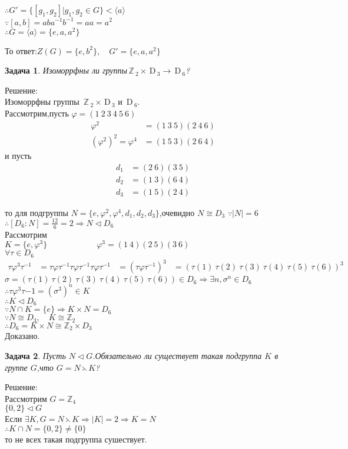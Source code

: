 \documentclass[12pt]{article} %
\theoremstyle{neosn} %
\newtheorem{problem}{Задача} %
\newcommand{\D}{\,\mathrm{D}\,}
\newcommand{\Z}{\,\mathbb{Z}\,}
\begin{document}
$\therefore G'=\{[g_1,g_2]|g_1,g_2\in G\} < \langle a \rangle$\\
$\because [a,b] = aba^{-1}b^{-1}=aa=a^2$\\
$\therefore G=\langle a \rangle = \{e,a,a^2\}$

То ответ:$Z(G)=\{e,b^2\},\quad G'= \{e,a,a^2\}$

\newpage
\begin{problem}
Изоморрфны ли группы$\Z_2\times \D_3\rightarrow\D_6$?
\end{problem}	

Решение:\\
Изоморрфны группы $\Z_2\times \D_3$ и $\D_6$.\\
Рассмотрим,пусть $\varphi = (1\  2\  3\  4\  5\  6)$
\begin{align*}
	\varphi^2&=(1\  3\  5)(2\  4\  6)\\
	(\varphi^2)^2=\varphi^4&=(1\  5\  3)(2\  6\  4)
\end{align*}
и пусть
\begin{align*}
	d_1 &= (2\  6)(3\  5)\\
	d_2 &= (1\  3)(6\  4)\\
	d_3 &= (1\  5)(2\  4)
\end{align*}

то для подгруппы $N = \{e,\varphi^2,\varphi^4,d_1,d_2,d_3\}$,очевидно $N \cong D_3$
$\because|N|=6$\\
$\therefore [D_6\colon N]=\frac{12}{6}=2 \Rightarrow N \lhd D_6$
\\
Рассмотрим\\
$K = \{e,\varphi^3\} \qquad \qquad \qquad \varphi^3=(1 \ 4)(2\ 5)(3 \ 6)$\\
$\forall \tau \in D_6$
\begin{align*}
	\tau \varphi^3 \tau^{-1} &= \tau \varphi \tau^{-1} \tau \varphi \tau^{-1} \tau \varphi \tau^{-1}
							&= (\tau \varphi \tau^{-1})^{3}
							&=(\tau(1)\ \tau(2)\ \tau(3)\ \tau(4)\ \tau(5)\ \tau(6) )^3
\end{align*}
$\sigma=(\tau(1)\ \tau(2)\ \tau(3)\ \tau(4)\ \tau(5)\ \tau(6)) \in D_6 \Rightarrow \exists n,\sigma^n \in D_6$\\
$\therefore \tau \varphi^3 \tau{-1}=(\sigma^3)^n\in K$\\
$\therefore K \lhd D_6$\\
$\because N \cap K = \{e\} \Rightarrow K \times N = D_6$\\
$\because N \cong D_3,\quad K \cong \mathbb{Z}_2$\\
$\therefore D_6 = K \times N \cong \mathbb{Z}_2 \times D_3$\\
Доказано.

\newpage
\begin{problem}
	Пусть $N \lhd G$.Обязательно ли существует такая подгруппа $K$ в группе $G$,что $G=N \leftthreetimes K$?
\end{problem}	
Решение:\\
Рассмотрим $G=\mathbb{Z}_4$\\
$\{0,2\} \lhd G$\\
Если $\exists K, G=N \leftthreetimes K \Rightarrow |K|=2 \Rightarrow K=N$\\
$\therefore K \cap N = \{0,2\} \neq \{0\}$\\
то не всех такая подгруппа сушествует.
\end{document}
